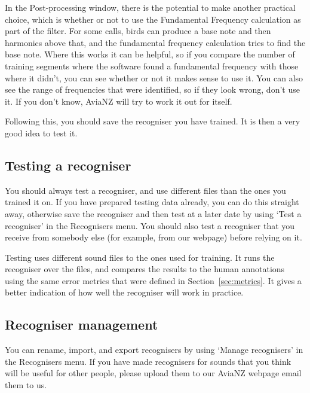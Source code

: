 \documentclass{article}
\begin{document}
In the Post-processing window, there is the potential to make another practical choice, which is whether or not to use the Fundamental Frequency calculation as part of the filter. For some calls, birds can produce a base note and then harmonics above that, and the fundamental frequency calculation tries to find the base note. Where this works it can be helpful, so if you compare the number of training segments where the software found a fundamental frequency with those where it didn't, you can see whether or not it makes sense to use it. You can also see the range of frequencies that were identified, so if they look wrong, don't use it. If you don't know, AviaNZ will try to work it out for itself. 

Following this, you should save the recogniser you have trained. It is then a very good idea to test it. 
    
\subsection{Testing a recogniser}\label{sec:testfilter}

You should always test a recogniser, and use different files than the ones you trained it on.
If you have prepared testing data already, you can do this straight away, otherwise save the recogniser and then test at a later date by using `Test a recogniser' in the Recognisers menu. You should also test a recogniser that you receive from somebody else (for example, from our webpage) before relying on it.

Testing uses different sound files to the ones used for training. It runs the recogniser over the files, and compares the results to the human annotations using the same error metrics that were defined in Section~\ref{sec:metrics}. It gives a better indication of how well the recogniser will work in practice. %

\subsection{Recogniser management}\label{sec:filters}

You can rename, import, and export recognisers by using `Manage recognisers' in the Recognisers menu. If you have made recognisers for sounds that you think will be useful for other people, please upload them to our AviaNZ webpage email them to us. 
   
\end{document}

